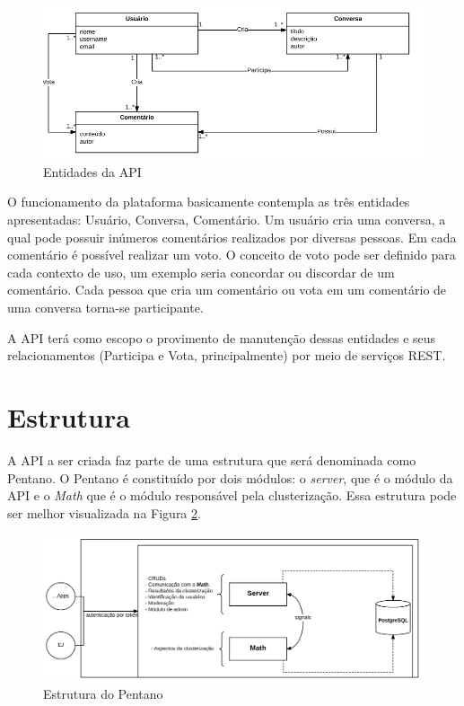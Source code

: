 \begin{figure}[h!]
\centering
\includegraphics[scale=0.5]{figuras/entidades.png}
\caption{Entidades da API}
\label{fig:entidades}
\end{figure}

O funcionamento da plataforma basicamente contempla as três entidades apresentadas: Usuário, Conversa, Comentário. Um usuário cria uma conversa, 
a qual pode possuir inúmeros comentários realizados por diversas pessoas. 
Em cada comentário é possível realizar um voto. O conceito de voto pode ser definido
para cada contexto de uso, um exemplo seria concordar ou discordar de um comentário. Cada pessoa que cria um comentário ou vota em um comentário
de uma conversa torna-se participante. 

A API terá como escopo o provimento de manutenção dessas entidades e seus relacionamentos (Participa e Vota, principalmente)
por meio de serviços REST.


\section{Estrutura}

A API a ser criada faz parte de uma estrutura que será denominada como Pentano. O Pentano é constituído por dois módulos: o \textit{server}, 
que é o módulo da API e o \textit{Math} que é o módulo responsável pela clusterização. 
Essa estrutura pode ser melhor visualizada na Figura \ref{fig:pentano}.

\begin{figure}[h!]
\centering
\includegraphics[scale=0.5]{figuras/esquema_pentano.png}
\caption{Estrutura do Pentano}
\label{fig:pentano}
\end{figure}


